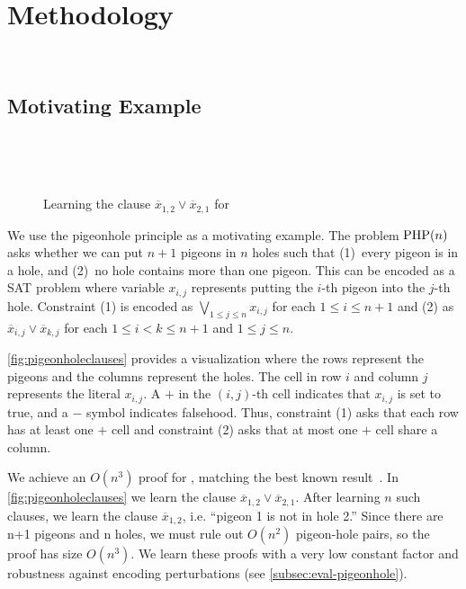 \section{Methodology}~\label{sec:method}

\subsection{Motivating Example}~\label{sec:motivatex}

\begin{figure*}[!t]
    \centering
    
    \caption{Learning the clause $\overline{x}_{1, 2} \lor \overline{x}_{2, 1}$
    for }~\label{fig:pigeonholeclauses}
  \end{figure*}

We use the pigeonhole principle as a motivating example. The problem $\mathrm{PHP}(n)$
asks whether we can put $n+1$ pigeons in $n$ holes such that (1)~every pigeon is
in a hole, and (2)~no hole contains more than one pigeon. This can be encoded as
a SAT problem where variable $x_{i, j}$ represents putting the $i$-th pigeon
into the $j$-th hole. Constraint (1) is encoded as $\bigvee_{1 \leq j \leq n}
x_{i, j}$ for each $1 \leq i \leq n+1$ and (2) as $\overline{x}_{i, j} \lor
\overline{x}_{k, j}$ for each $ 1 \leq i < k \leq n+1$ and $1 \leq j \leq n$.

\autoref{fig:pigeonholeclauses} provides a visualization where the rows
represent the pigeons and the columns represent the holes. The cell in row $i$
and column $j$ represents the literal $x_{i, j}$.
A $+$ in the $(i, j)$-th cell indicates that $x_{i, j}$ is set to true, and a
$-$ symbol indicates falsehood. Thus, constraint (1) asks that each row has at
least one $+$ cell and constraint (2) asks that at most one $+$ cell share a
column.

We achieve an $O(n^3)$ \pr proof for , matching the best known
result~\cite{prclauses}. In \autoref{fig:pigeonholeclauses} we learn the clause
$\overline{x}_{1, 2} \lor \overline{x}_{2, 1}$. After learning $n$ such clauses,
we learn the clause $\overline{x}_{1, 2}$, i.e. “pigeon 1 is not in hole 2.”
Since there are n+1 pigeons and n holes, we must rule out $O(n^2)$ pigeon-hole
pairs, so the proof has size $O(n^3)$. We learn these proofs with a very low
constant factor and robustness against encoding perturbations (see
\autoref{subsec:eval-pigeonhole}).

